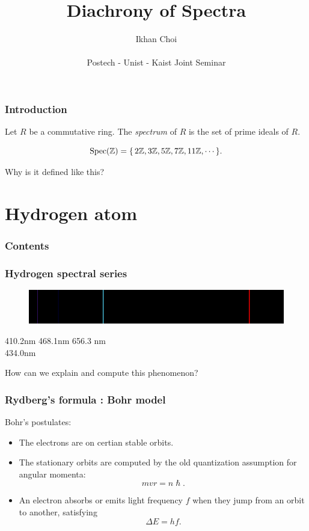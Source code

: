 \documentclass{beamer}
\title{Diachrony of Spectra}
\author{Ikhan Choi \\ \quad \\ Postech - Unist - Kaist Joint Seminar}
\begin{document}
\maketitle

\begin{frame}
\frametitle{Introduction}
  \pause
  \begin{defn}
    Let $R$ be a commutative ring.
    The \emph{spectrum} of $R$ is the set of prime ideals of $R$.
  \end{defn}
  \pause
  \begin{ex}
  	\[\operatorname{Spec}(\mathbb{Z})=\{\,2\mathbb{Z},3\mathbb{Z},5\mathbb{Z},7\mathbb{Z},11\mathbb{Z},\cdots\,\}.\]
  \end{ex}
  \pause
  \begin{qn}
    Why is it defined like this?
  \end{qn}
\end{frame}


\section{Hydrogen atom}

\begin{frame}
\frametitle{Contents}
  \tableofcontents[currentsection]
\end{frame}

\begin{frame}
\frametitle{Hydrogen spectral series}
  \begin{figure}\includegraphics[scale=.4]{emission.png}\end{figure}
  \pause 410.2nm \hspace{2em} 468.1nm \hspace{12em} 656.3 nm\\ \hspace{2em} 434.0nm\\
  \bigskip
  \pause
  \begin{qn}
    How can we explain and compute this phenomenon?
  \end{qn}
\end{frame}

\begin{frame}
\frametitle{Rydberg's formula : Bohr model}
  Bohr's postulates:\pause
  \begin{itemize}[<+->]
    \item The electrons are on certian stable orbits.
    \item The stationary orbits are computed by the old quantization assumption for angular momenta:
    \[mvr=n\hslash.\]
    \item An electron absorbs or emits light frequency $f$ when they jump from an orbit to another, satisfying
    \[\Delta E=hf.\]
  \end{itemize}
\end{frame}
\end{document}
